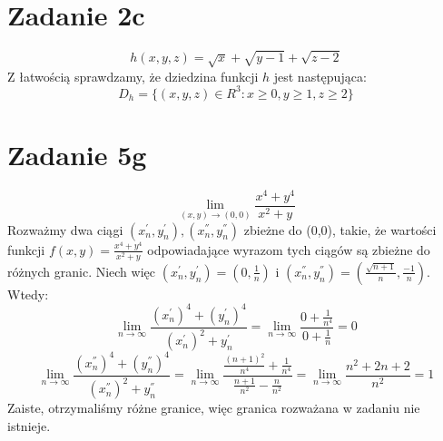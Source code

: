 \documentclass{article}
\begin{document}

\section*{Zadanie 2c}
$$h(x,y,z) = \sqrt{x}+\sqrt{y-1}+\sqrt{z-2}$$
Z łatwością sprawdzamy, że dziedzina funkcji $h$ jest następująca: 
$$D_h = \{ (x,y,z) \in R^3: x \geq 0, y \geq 1, z \geq 2 \}$$




\section*{Zadanie 5g}
$$\lim_{(x,y)\to (0,0)} \frac{x^4+y^4}{x^2+y}$$
Rozważmy dwa ciągi $(x_n^{'}, y_n^{'}), (x_n^{''}, y_n^{''})$ zbieżne do (0,0), takie, że wartości funkcji $f(x,y) = \frac{x^4+y^4}{x^2+y}$ odpowiadające wyrazom tych ciągów są zbieżne do różnych granic. Niech więc $(x_n^{'}, y_n^{'}) = (0, \frac{1}{n})$ i $(x_n^{''}, y_n^{''}) = (\frac{\sqrt{n+1}}{n},\frac{-1}{n})$. Wtedy:
$$\lim_{n \to \infty} \frac{(x_n^{'})^4 +(y_n^{'})^4 }{(x_n^{'})^2 + y_n^{'}} = \lim_{n \to \infty} \frac{0+\frac{1}{n^4}}{0+\frac{1}{n}} = 0$$
$$\lim_{n \to \infty} \frac{(x_n^{''})^4 +(y_n^{''})^4 }{(x_n^{''})^2 + y_n^{''}} = \lim_{n \to \infty} \frac{\frac{(n+1)^2}{n^4}+\frac{1}{n^4}}{\frac{n+1}{n^2}-\frac{n}{n^2}} = \lim_{n \to \infty} \frac{n^2+2n+2}{n^2} = 1$$
Zaiste, otrzymaliśmy różne granice, więc granica rozważana w zadaniu nie istnieje.
\end{document}
